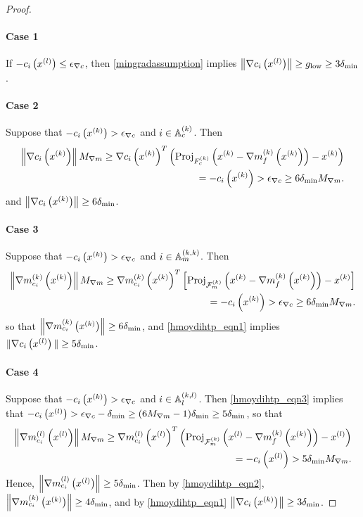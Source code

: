 \begin{proof}
\paragraph*{Case 1}
If $-c_i\left({x^{(l)}}\right) \le {\epsilon_{\nabla c}}$, then \cref{mingradassumption} implies $\left\| \nabla c_i\left({x^{(l)}}\right) \right\| \ge { g_{\textrm{low}} } \ge 3 {\delta_{\textrm{min}}}$.

\paragraph*{Case 2}
Suppose that $-c_i\left(x^{(k)}\right) > {\epsilon_{\nabla c}}$ and $i \in {\mathbb A_c^{(k)}}$.
Then
\begin{align*}
\left\|\nabla c_i\left(x^{(k)}\right)  \right\| {M_{\nabla m}}
\ge \nabla c_i\left(x^{(k)}\right) ^T\left({\textrm{Proj}}_{{F_c^{(k)}}}\left(x^{(k)} - {\nabla m_f^{(k)}\left(x^{(k)}\right)}\right) - x^{(k)}\right) \\
= -c_i\left(x^{(k)}\right) > {\epsilon_{\nabla c}} \ge 6 {\delta_{\textrm{min}}} {M_{\nabla m}}.
\end{align*}
and $\left\|\nabla c_i\left(x^{(k)}\right)  \right\| \ge 6 {\delta_{\textrm{min}}}$.


\paragraph*{Case 3}
Suppose that $-c_i\left(x^{(k)}\right) > {\epsilon_{\nabla c}}$ and $i \in {\mathbb A_m^{(k, k)}}$.
Then
\begin{align*}
\left\|{\nabla m_{c_i}^{(k)}\left(x^{(k)}\right)}\right\| {M_{\nabla m}}
\ge {\nabla m_{c_i}^{(k)}\left(x^{(k)}\right)}^T\left[{\textrm{Proj}}_{{\mathcal F_m^{(k)}}}\left(x^{(k)} - {\nabla m_f^{(k)}\left(x^{(k)}\right)}\right) - x^{(k)}\right] \\
= -c_i\left(x^{(k)}\right) > {\epsilon_{\nabla c}} \ge 6 {\delta_{\textrm{min}}} {M_{\nabla m}}.
\end{align*}
so that $\left\|{\nabla m_{c_i}^{(k)}\left(x^{(k)}\right)}\right\| \ge 6 {\delta_{\textrm{min}}}$, and \cref{hmoydihtp_eqn1} implies $\| \nabla c_i\left({x^{(l)}}\right) \| \ge 5 {\delta_{\textrm{min}}}$.

\paragraph*{Case 4}
Suppose that $-c_i\left(x^{(k)}\right) > {\epsilon_{\nabla c}}$ and $i \in {\mathbb A_l^{(k, l)}}$.
Then \cref{hmoydihtp_eqn3} implies that $-c_i\left({x^{(l)}}\right) > {\epsilon_{\nabla c}} - {\delta_{\textrm{min}}} \ge (6{M_{\nabla m}} - 1) {\delta_{\textrm{min}}} \ge 5 {\delta_{\textrm{min}}}$, so that
\begin{align*}
\left\|{\nabla m_{c_i}^{(l)}\left({x^{(l)}}\right)}\right\| {M_{\nabla m}}
\ge {\nabla m_{c_i}^{(l)}\left({x^{(l)}}\right)}^T\left({\textrm{Proj}}_{{\mathcal F_m^{(k)}}}\left({x^{(l)}} - {\nabla m_f^{(k)}\left(x^{(k)}\right)}\right) - {x^{(l)}}\right) \\
= -c_i\left({x^{(l)}}\right) > 5 {\delta_{\textrm{min}}} {M_{\nabla m}}.
\end{align*}
Hence, $\left\|{\nabla m_{c_i}^{(l)}\left({x^{(l)}}\right)}\right\| \ge 5 {\delta_{\textrm{min}}}$.
Then by \cref{hmoydihtp_eqn2}, $\left\|{\nabla m_{c_i}^{(k)}\left(x^{(k)}\right)}\right\| \ge 4 {\delta_{\textrm{min}}}$, and by \cref{hmoydihtp_eqn1} $\left\|\nabla c_i\left(x^{(k)}\right) \right\| \ge 3 {\delta_{\textrm{min}}}$.



\end{proof}
